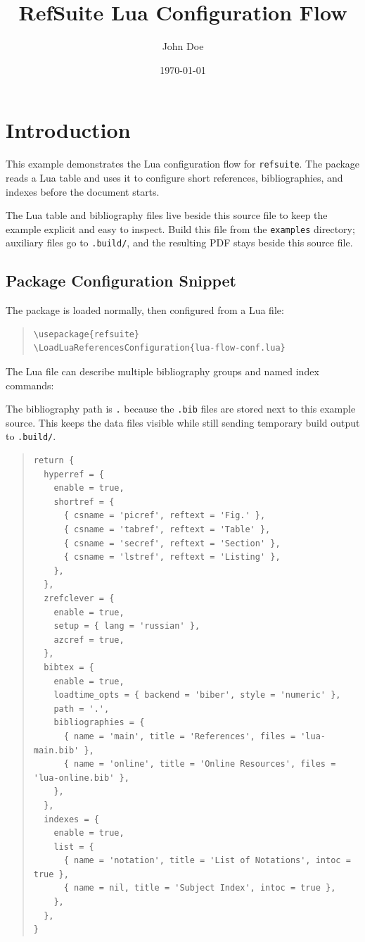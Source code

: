 \documentclass{article}
\newcounter{listing}
\begin{document}
\title{RefSuite Lua Configuration Flow}
\author{John Doe}
\date{\today}
\maketitle

\tableofcontents

\section{Introduction}
\label{sec:introduction}

This example demonstrates the Lua configuration flow for \texttt{refsuite}. The
package reads a Lua table and uses it to configure short references,
bibliographies, and indexes before the document starts.

The Lua table and bibliography files live beside this source file to keep the
example explicit and easy to inspect.  Build this file from the \texttt{examples}
directory; auxiliary files go to \texttt{.build/}, and the resulting PDF stays
beside this source file.

\subsection{Package Configuration Snippet}

The package is loaded normally, then configured from a Lua file:

\begin{quote}
\begin{verbatim}
\usepackage{refsuite}
\LoadLuaReferencesConfiguration{lua-flow-conf.lua}
\end{verbatim}
\end{quote}

The Lua file can describe multiple bibliography groups and named index commands:

The bibliography path is \texttt{.} because the \texttt{.bib} files are stored
next to this example source.  This keeps the data files visible while still
sending temporary build output to \texttt{.build/}.

\begin{quote}
\begin{verbatim}
return {
  hyperref = {
    enable = true,
    shortref = {
      { csname = 'picref', reftext = 'Fig.' },
      { csname = 'tabref', reftext = 'Table' },
      { csname = 'secref', reftext = 'Section' },
      { csname = 'lstref', reftext = 'Listing' },
    },
  },
  zrefclever = {
    enable = true,
    setup = { lang = 'russian' },
    azcref = true,
  },
  bibtex = {
    enable = true,
    loadtime_opts = { backend = 'biber', style = 'numeric' },
    path = '.',
    bibliographies = {
      { name = 'main', title = 'References', files = 'lua-main.bib' },
      { name = 'online', title = 'Online Resources', files = 'lua-online.bib' },
    },
  },
  indexes = {
    enable = true,
    list = {
      { name = 'notation', title = 'List of Notations', intoc = true },
      { name = nil, title = 'Subject Index', intoc = true },
    },
  },
}
\end{verbatim}
\end{quote}
\label{lst:configuration}
\end{document}
